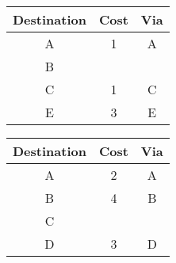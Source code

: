 \documentclass[a4paper,
			llpt,
			solution,
			accentcolor=tud2d,
			colorbacktitle
			]
			{tudexercise}
\newcommand{\8}{$\infty$}
\begin{document}
\begin{tabular}{c|c|c}
Destination & Cost & Via \\ \hline
A           & 1    & A   \\
B           &      &     \\
C           & 1    & C   \\
E           & 3    & E   \\
\end{tabular}
\begin{tabular}{c|c|c}
Destination & Cost & Via \\ \hline
A           & 2    & A   \\
B           & 4    & B   \\
C           &      &     \\
D           & 3    & D   \\
\end{tabular}
\end{document}
